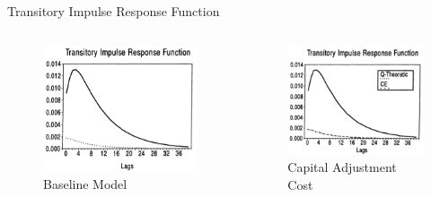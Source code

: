 \documentclass[10pt]{beamer}
\begin{document}
\begin{frame}{Transitory Impulse Response Function}
    \begin{columns}[T,onlytextwidth]
        \begin{figure}
            \centering
            \includegraphics[width=\linewidth]{figures/Base_trans_IRF.png}
            \caption{Baseline Model}
        \end{figure}

        \begin{figure}
            \centering
            \includegraphics[width=\linewidth]{figures/K_trans_IRF.png}
            \caption{Capital Adjustment Cost}
        \end{figure}


\end{columns}
\end{frame}
\end{document}
